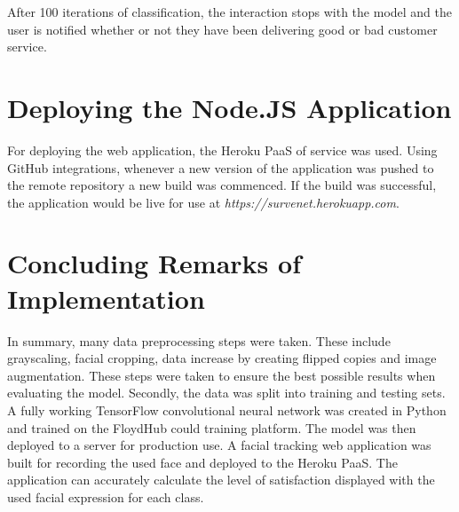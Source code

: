 After 100 iterations of classification, the interaction stops with the model and the user is notified whether or not they have been delivering good or bad customer service.



\section{Deploying the Node.JS Application}


For deploying the web application, the Heroku PaaS of service was used. Using GitHub integrations, whenever a new version of the application was pushed to the remote repository a new build was commenced. If the build was successful, the application would be live for use at \textit{https://survenet.herokuapp.com}.

\section{Concluding Remarks of Implementation}

In summary, many data preprocessing steps were taken. These include grayscaling, facial cropping, data increase by creating flipped copies and image augmentation. These steps were taken to ensure the best possible results when evaluating the model. Secondly, the data was split into training and testing sets. A fully working TensorFlow convolutional neural network was created in Python and trained on the FloydHub could training platform. The model was then deployed to a server for production use. A facial tracking web application was built for recording the used face and deployed to the Heroku PaaS. The application can accurately calculate the level of satisfaction displayed with the used facial expression for each class.



